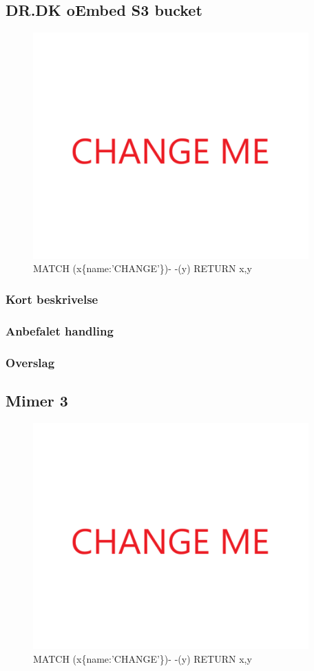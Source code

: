 \documentclass{article}
\begin{document}
\subsection{DR.DK oEmbed S3 bucket}
\begin{figure}[h]
\includegraphics[width=300pt]{CHANGE.PNG}
\caption{MATCH (x\{name:'CHANGE'\})- -(y) RETURN x,y}
\end{figure}
\subsubsection{Kort beskrivelse}
\subsubsection{Anbefalet handling}
\subsubsection{Overslag}
\subsection{Mimer 3}
\begin{figure}[h]
\includegraphics[width=300pt]{CHANGE.PNG}
\caption{MATCH (x\{name:'CHANGE'\})- -(y) RETURN x,y}
\end{figure}
\end{document}
